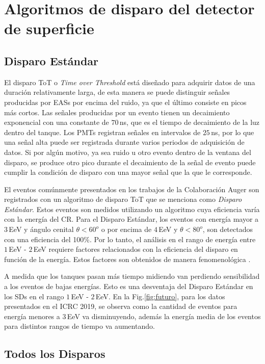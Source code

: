 \section{Algoritmos de disparo del detector de superficie} \label{triggers_caracteristicas}

\subsection{Disparo Estándar}

El disparo ToT o \emph{Time over Threshold} está diseñado para adquirir datos de una duración relativamente larga, de esta manera se puede distinguir señales producidas por EASs por encima del ruido, ya que el último consiste en picos más cortos. Las señales producidas por un evento tienen un decaimiento exponencial con una constante de $70\,$ns, que es el tiempo de decaimiento de la luz dentro del tanque. Los PMTs registran señales en intervalos de $25\,$ns, por lo que una señal alta puede ser registrada durante varios periodos de adquisición de datos. Si por algún motivo, ya sea ruido u otro evento dentro de la ventana del disparo, se produce otro pico durante el decaimiento de la señal de evento puede cumplir la condición de disparo con una mayor señal que la que le corresponde.

{El eventos comúnmente presentados en los trabajos de la Colaboración Auger son registrados con un algoritmo de disparo ToT que se menciona como \emph{Disparo Estándar}.  Estos eventos son medidos utilizando un algoritmo cuya eficiencia varía con la energía del CR. Para el Disparo Estándar, los eventos con energía mayor a $3\,$EeV y ángulo cenital $\theta<60^o$ o  por encima de $4\,$EeV y $\theta<80^o$, son detectados con una eficiencia del 100\%. Por lo tanto, el análisis en el rango de energía entre $1\,$EeV - $2\,$EeV requiere factores relacionados con la eficiencia del disparo en función de la energía. Estos factores son obtenidos de manera fenomenológica \cite{taborda}.}


A medida que los tanques pasan más tiempo midiendo van perdiendo sensibilidad a los eventos de bajas energías. Esto es una desventaja del Disparo Estándar en los SDs en el rango $1\,$EeV - $2\,$EeV.  En la Fig.\ref{fig:futuro}, para los datos presentados en el ICRC 2019, se observa como la cantidad de eventos para energía menores a $3\,$EeV va disminuyendo, además la energía media de los eventos para distintos rangos de tiempo va aumentando.

 
\subsection{Todos los Disparos}

